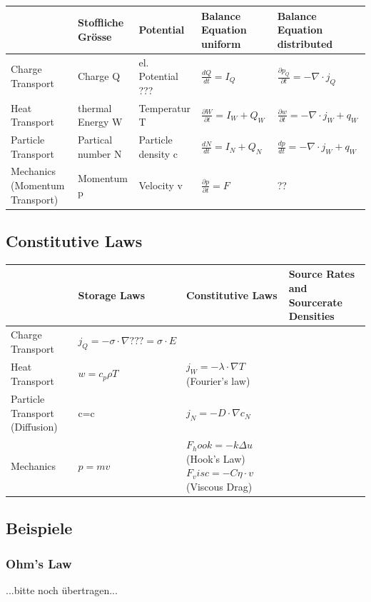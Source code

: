 \documentclass[a4paper]{scrartcl}
\begin{document}
\begin{tabular}{|p{3cm}|p{3cm}|p{3cm}|p{3cm}|p{3cm}|}
\hline  & Stoffliche Grösse & Potential & Balance Equation uniform & Balance Equation distributed \\ 
\hline Charge Transport & Charge Q & el. Potential ??? & $\frac{dQ}{dt}=I_Q$ & $ \frac{\partial p_Q}{\partial t}=-\nabla\cdot j_Q$ \\ 
\hline Heat Transport & thermal Energy W & Temperatur T & $\frac{\partial W}{\partial t}= I_W+Q_W$ & $\frac{\partial w}{\partial t}= -\nabla \cdot j_W+q_W$  \\ 
\hline Particle Transport & Partical number N & Particle density c & $\frac{dN}{dt}=I_N+Q_N$ & $\frac{dp}{dt}=-\nabla \cdot j_W +q_W$ \\ 
\hline Mechanics (Momentum Transport) & Momentum p & Velocity v  & $\frac{\partial p}{\partial t}=F$ & ?? \\ 
\hline 
\end{tabular} 

\subsection{Constitutive Laws}

\begin{tabular}{|p{3cm}|p{3cm}|p{6cm}|p{3cm}|}
\hline  & Storage Laws & Constitutive Laws & Source Rates and Sourcerate Densities \\
\hline Charge Transport & $j_Q=-\sigma \cdot \nabla ??? = \sigma \cdot E$ & & \\
 
\hline Heat Transport & $w=c_p \rho T$ & $j_W=-\lambda \cdot \nabla T$  (Fourier's law)&  \\ 
\hline Particle Transport (Diffusion) & c=c & $j_N=- D \cdot \nabla c_N$ &  \\ 
\hline Mechanics & $p=mv$ & $F_hook = - k \Delta u$ (Hook's Law) $F_visc=-C \eta \cdot v$ (Viscous Drag) &  \\ 
\hline 
\end{tabular} 

\subsection{Beispiele}
\subsubsection{Ohm's Law}
...bitte noch übertragen...
\end{document}
